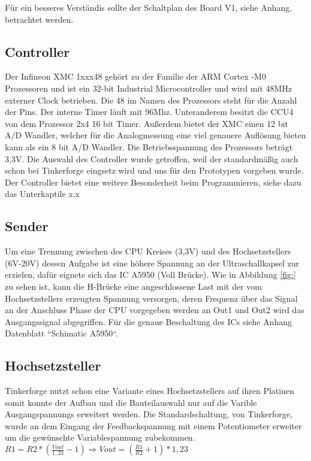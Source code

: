 Für ein besseres Verständis sollte der Schaltplan des Board V1, siehe Anhang, betrachtet werden.

\subsection{Controller}
Der Infineon XMC 1xxx48 gehört zu der Familie der ARM Cortex -M0 Prozessoren und ist ein 32-bit Industrial Microcontroller und wird mit 48MHz externer Clock betrieben. Die 48 im Namen des Prozessors steht für die Anzahl der Pins. Der interne Timer läuft mit 96Mhz. Unteranderem besitzt die CCU4 von dem Prozessor 2x4 16 bit Timer. Außerdem bietet der XMC einen 12 bit A/D Wandler, welcher für die Analogmessung eine viel genauere Auflösung bieten kann als ein 8 bit A/D Wandler. Die Betriebsspannung des Prozessors beträgt 3,3V. Die Auswahl des Controller wurde getroffen, weil der standardmäßig auch schon bei Tinkerforge eingsetz wird und uns für den Prototypen vorgeben wurde. Der Controller bietet eine weitere Besonderheit beim Programmieren, siehe dazu das Unterkaptile x.x\


\subsection{Sender}%
Um eine Trennung zwischen des CPU Kreises (3,3V) und des Hochsetzstellers (6V-20V) dessen Aufgabe ist eine höhere Spannung an der Ultraschallkapsel zur erzielen, dafür eignete sich das IC A5950 (Voll Brücke).
Wie in Abbildung \ref{fig:} zu sehen ist, kann die H-Brücke eine angeschlossene Last mit der vom Hochsetzstellers erzeugten Spannung versorgen, deren Frequenz über das Signal an der Anschluss Phase der CPU vorgegeben werden an Out1 und Out2 wird das Ausgangssignal abgegriffen. Für die genaue Beschaltung des ICs siehe Anhang Datenblatt “Schimatic A5950“.

\subsection{Hochsetzsteller}%
Tinkerforge nutzt schon eine Variante eines Hochsetzstellers auf ihren Platinen somit konnte der Aufbau und die Bauteilauswahl nur auf die Varible Ausgangspannungs  erweitert werden.
Die Standardschaltung, von Tinkerforge, wurde an dem Eingang der Feedbackspannung mit einem Potentiometer erweiter um die gewünschte Variablespannung zubekommen.  
\onehalfspacing \\
\(\displaystyle R1=R2*\left(\frac{Vout}{1,23}-1\right)\Rightarrow Vout=\left(\frac{R1}{R2}+1\right)*1,23\) 
\singlespacing


